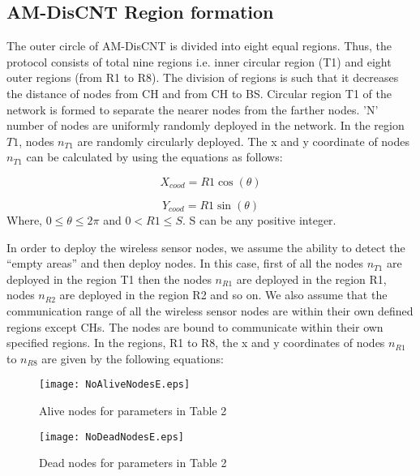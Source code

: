 \documentclass[journal]{IEEEtran}
\begin{document}
\subsection{AM-DisCNT Region formation}
 The outer circle of AM-DisCNT is divided into eight equal regions. Thus, the protocol consists of total nine regions i.e. inner circular region (T1) and eight outer regions (from R1 to R8). The division of regions is such that it decreases the distance of nodes from CH and from CH to BS. Circular region T1 of the network is formed to separate the nearer nodes from the farther nodes. 'N' number of nodes are uniformly randomly deployed in the network.
 In the region $T1$, nodes $n_{T1}$ are randomly circularly deployed. The x and y coordinate of nodes $n_{T1}$ can be calculated by using the equations as follows:


 \begin{equation}
 X_{cood} = R1\cos(\theta)
 \end{equation}

 \begin{equation}
 Y_{cood} = R1\sin(\theta)
 \end{equation}
 Where, $0\leq \theta\leq2\pi$ and $0<R1\leq S$. S can be any positive integer.

 In order to deploy the wireless sensor nodes, we assume the ability to detect the “empty areas” and then deploy nodes. In this case, first of all the nodes $n_{T1}$ are deployed in the region T1 then the nodes $n_{R1}$ are deployed in the region R1, nodes $n_{R2}$ are deployed in the region R2 and so on. We also assume that the communication range of all the wireless sensor nodes are within their own defined regions except CHs. The nodes are bound to communicate within their own specified regions.
 In the regions, R1 to R8, the x and y coordinates of nodes $n_{R1}$ to $n_{R8}$ are given by the following equations:
 \begin{figure}[ht]
\begin{center}
\texttt{[image: NoAliveNodesE.eps]}
\vspace{-0.7cm}
\caption{Alive nodes for parameters in Table 2}
\end{center}
\end{figure}

\begin{figure}[ht]
\begin{center}
\texttt{[image: NoDeadNodesE.eps]}
\vspace{-0.7cm}
\caption{Dead nodes for parameters in Table 2}
\end{center}
\end{figure}
\end{document}
